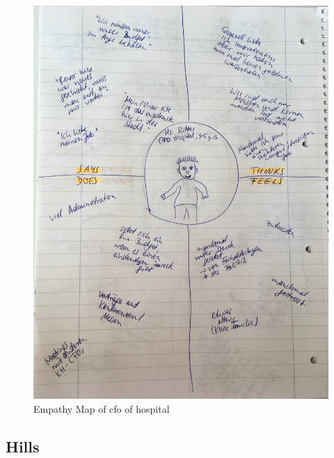 \begin{figure}[h!]
	\centering
	\includegraphics[width=1\textwidth]{images/empathymap_cfo.jpg}
	\caption{Empathy Map of \ac{cfo} of hospital}
	\label{verticallatter}
\end{figure}


\subsection{Hills}

